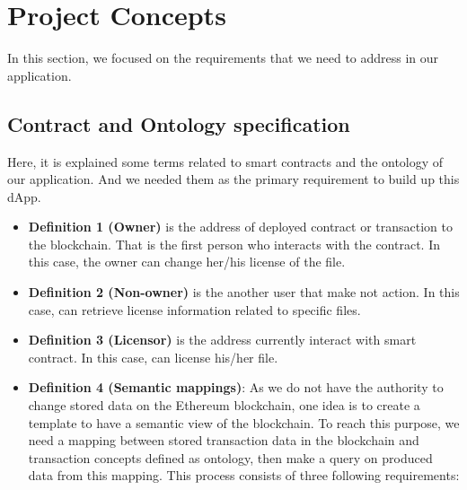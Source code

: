      

\section{Project Concepts}

In this section, we focused on the requirements that we need to address in our application.
\\
\subsection{Contract and Ontology specification}
Here, it is explained some terms related to smart contracts and the ontology of our application. And we needed them as the primary requirement to build up this dApp.
\begin{itemize}
	\item \textbf{Definition 1 (Owner)} is the address of deployed contract or transaction to the blockchain. That is the first person who interacts with the contract. In this case, the owner can change her/his license of the file.\\
	\item \textbf{Definition 2 (Non-owner)} is the another user that make not action. In this case, can retrieve license information related to specific files.\\
	\item \textbf{Definition 3 (Licensor)} is the address currently interact with smart contract. In this case, can license his/her file.\\ 
	\item \textbf{Definition 4 (Semantic mappings)}: As we do not have the authority to change stored data on the Ethereum blockchain, one idea is to create a template to have a semantic view of the blockchain.
	To reach this purpose, we need a mapping between stored transaction data in the blockchain and transaction concepts defined as ontology, then make a query on produced data from this mapping. This process consists of three following requirements:
	

\end{itemize}
